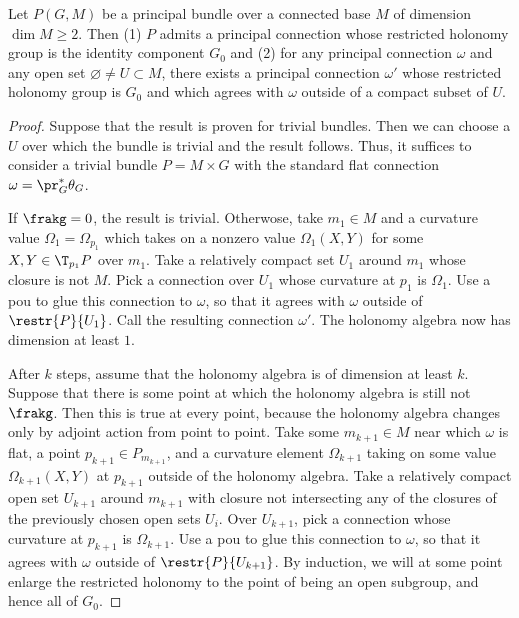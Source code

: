 \begin{lem}\label{lem 16.24 McKay}
    Let $P(G,M)$ be a principal bundle over a connected base $M$ of dimension $\dim M\geq 2$. Then (1) $P$ admits a principal connection whose restricted holonomy group is the identity component $G_0$ and (2) for any principal connection $\omega$ and any open set $\varnothing\neq U\subset M$, there exists a principal connection $\omega'$ whose restricted holonomy group is $G_0$ and which agrees with $\omega$ outside of a compact subset of $U$.
\end{lem}
\begin{proof}
    Suppose that the result is proven for trivial bundles. Then we can choose a $U$ over which the bundle is trivial and the result follows. Thus, it suffices to consider a trivial bundle $P=M\times G$ with the standard flat connection $\omega=\pr_G^\ast\theta_G$.

    If $\frakg=0$, the result is trivial. Otherwose, take $m_1\in M$ and a curvature value $\Omega_1=\Omega_{p_1}$ which takes on a nonzero value $\Omega_1(X,Y)$ for some $X,Y\in\T_{p_1}P$ over $m_1$. Take a relatively compact set $U_1$ around $m_1$ whose closure is not $M$. Pick a connection over $U_1$ whose curvature at $p_1$ is $\Omega_1$. Use a \gls{pou} to glue this connection to $\omega$, so that it agrees with $\omega$ outside of $\restr{P}{U_1}$. Call the resulting connection $\omega'$. The holonomy algebra now has dimension at least $1$.

    After $k$ steps, assume that the holonomy algebra is of dimension at least $k$. Suppose that there is some point at which the holonomy algebra is still not $\frakg$. Then this is true at every point, because the holonomy algebra changes only by adjoint action from point to point. Take some $m_{k+1}\in M$ near which $\omega$ is flat, a point $p_{k+1}\in P_{m_{k+1}}$, and a curvature element $\Omega_{k+1}$ taking on some value $\Omega_{k+1}(X,Y)$ at $p_{k+1}$ outside of the holonomy algebra. Take a relatively compact open set $U_{k+1}$ around $m_{k+1}$ with closure not intersecting any of the closures of the previously chosen open sets $U_i$. Over $U_{k+1}$, pick a connection whose curvature at $p_{k+1}$ is $\Omega_{k+1}$. Use a \gls{pou} to glue this connection to $\omega$, so that it agrees with $\omega$ outside of $\restr{P}{U_{k+1}}$. By induction, we will at some point enlarge the restricted holonomy to the point of being an open subgroup, and hence all of $G_0$.
\end{proof}

